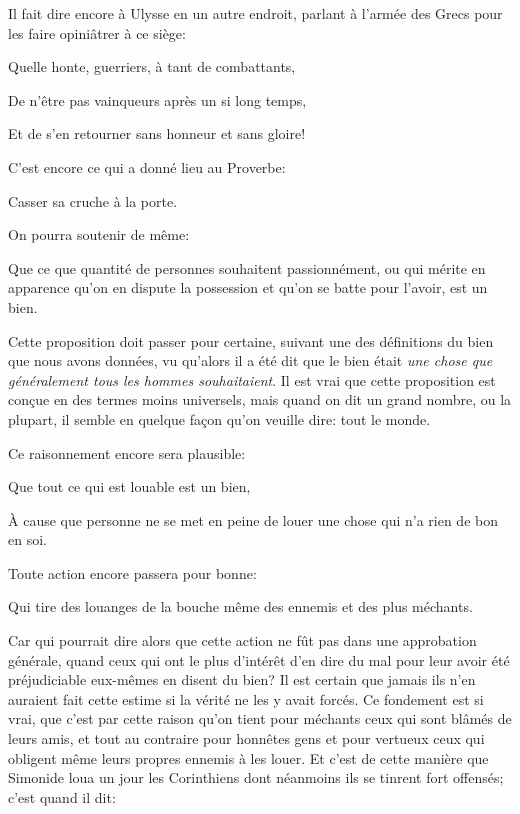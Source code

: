 Il fait dire encore à Ulysse en un autre endroit, parlant à l'armée des Grecs pour les faire opiniâtrer à ce siège:

\begin{emphpar}
      Quelle honte, guerriers, à tant de combattants,

	  De n'être pas vainqueurs après un si long temps,
	  
	  Et de s'en retourner sans honneur et sans gloire!
\end{emphpar}

C'est encore ce qui a donné lieu au Proverbe:

\begin{emphpar}
	   Casser sa cruche à la porte. 
\end{emphpar}

\bigbreak

On pourra soutenir de même:

\begin{emphpar}
	   Que ce que quantité de personnes souhaitent passionnément, ou qui mérite en apparence qu'on en dispute la
	   possession et qu'on se batte pour l'avoir, est un bien.
\end{emphpar}

Cette proposition doit passer pour certaine, suivant une des définitions du bien que nous avons données, vu qu'alors
il a été dit que le bien était \emph{une chose que généralement tous les hommes souhaitaient}. Il est vrai que cette
proposition est conçue en des termes moins universels, mais quand on dit un grand nombre, ou la plupart, il semble en
quelque façon qu'on veuille dire: tout le monde.

\bigbreak

Ce raisonnement encore sera plausible:

\begin{emphpar}
	   Que tout ce qui est louable est un bien,
\end{emphpar}

À cause que personne ne se met en peine de louer une chose qui n'a rien de bon en soi. 

\bigbreak

Toute action encore passera pour bonne:

\begin{emphpar}
	   Qui tire des louanges de la bouche même des ennemis et des plus méchants.
\end{emphpar}

Car qui pourrait dire alors que cette action ne fût pas dans une approbation générale, quand ceux qui ont le plus d'intérêt
d'en dire du mal pour leur avoir été préjudiciable eux-mêmes en disent du bien? Il est certain que jamais ils n'en auraient
fait cette estime si la vérité ne les y avait forcés. Ce fondement est si vrai, que c'est par cette raison qu'on tient pour
méchants ceux qui sont blâmés de leurs amis, et tout au contraire pour honnêtes gens et pour vertueux ceux qui obligent même
leurs propres ennemis à les louer. Et c'est de cette manière que Simonide loua un jour les Corinthiens dont néanmoins ils se
tinrent fort offensés; c'est quand il dit:


